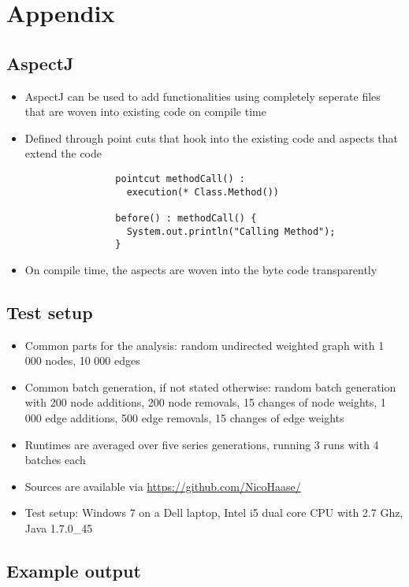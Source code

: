 \section{Appendix}
\subsection{AspectJ} \label{sec:aspectj}
	\begin{itemize}
		\item AspectJ can be used to add functionalities using completely
			seperate files that are woven into existing code on compile time
		\item Defined through point cuts that hook into the existing code and aspects that
			extend the code
	
			\begin{verbatim}
				pointcut methodCall() :
				  execution(* Class.Method())
				  
				before() : methodCall() {
				  System.out.println("Calling Method");
				}
			\end{verbatim}
		
		\item On compile time, the aspects are woven into the byte code transparently
		
	\end{itemize}
\subsection{Test setup} \label{sec:testSetup}
	\begin{itemize}
		\item Common parts for the analysis: random undirected weighted graph with 1 000 nodes,
			10 000 edges
		\item Common batch generation, if not stated otherwise: random batch generation with 200
			node additions, 200 node removals, 15 changes of node weights, 1 000 edge additions,
			500 edge removals, 15 changes of edge weights
		\item Runtimes are averaged over five series generations, running 3 runs with 4 batches
			each
		\item Sources are available via \url{https://github.com/NicoHaase/}
		\item Test setup: Windows 7 on a Dell laptop, Intel i5 dual core CPU with 2.7 Ghz, Java
			1.7.0\_45
	\end{itemize}
	
\subsection{Example output} \label{sec:exampleOutput}
	